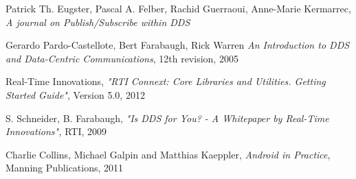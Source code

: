 \begin{thebibliography}{9}

Patrick Th. Eugster, Pascal A. Felber, Rachid Guerraoui, Anne-Marie Kermarrec, \emph{A journal on Publish/Subscribe within DDS} 

Gerardo Pardo-Castellote, Bert Farabaugh, Rick Warren
\emph{An Introduction to DDS and Data-Centric Communications}, 12th revision, 2005

Real-Time Innovations, \emph{"RTI Connext: Core Libraries and Utilities. Getting Started
Guide"}, Version 5.0, 2012

S. Schneider, B. Farabaugh, \emph{"Is DDS for You? - A Whitepaper by Real-Time Innovations",}
RTI, 2009

Charlie Collins, Michael Galpin and Matthias Kaeppler, \emph{Android in Practice}, Manning Publications, 2011


\end{thebibliography} 